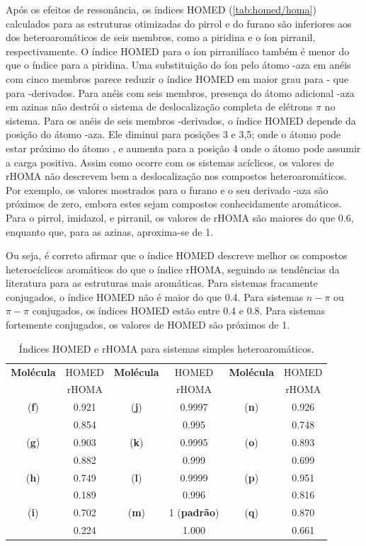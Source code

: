 Após os efeitos de ressonância, os índices \gls{HOMED} (\autoref{tab:homed/homa}) calculados para as estruturas otimizadas do pirrol e do furano são inferiores aos dos heteroaromáticos de seis membros, como a piridina e o íon pirranil, respectivamente. O índice \gls{HOMED} para o íon pirranilíaco também é menor do que o índice para a piridina. Uma substituição do íon  pelo átomo -aza em anéis com cinco membros parece reduzir o índice \gls{HOMED} em maior grau para - que para -derivados. Para anéis com seis membros, presença do átomo adicional -aza em azinas não destrói o sistema de deslocalização completa de elétrons $\pi$ no sistema. Para os anéis de seis membros -derivados, o índice \gls{HOMED} depende da posição do átomo -aza. Ele diminui para posições 3 e 3,5; onde o átomo  pode estar próximo do átomo , e aumenta para a posição 4 onde o átomo  pode assumir a carga positiva. Assim como ocorre com os sistemas acíclicos, os valores de \gls{rHOMA} não descrevem bem a deslocalização nos compostos heteroaromáticos. Por exemplo, os valores mostrados para o furano e o seu derivado -aza são próximos de zero, embora estes sejam compostos conhecidamente aromáticos. Para o pirrol, imidazol, e pirranil, os valores de \gls{rHOMA} são maiores do que 0.6, enquanto que, para as azinas, aproxima-se de 1. 

Ou seja, é correto afirmar que o índice \gls{HOMED} descreve melhor os compostos heterocíclicos aromáticos do que o índice \gls{rHOMA}, seguindo as tendências da literatura para as estruturas mais aromáticas. Para sistemas fracamente conjugados, o índice \gls{HOMED} não é maior do que 0.4. Para sistemas $n-\pi$ ou $\pi-\pi$ conjugados, os índices \gls{HOMED} estão entre 0.4 e 0.8. Para sistemas fortemente conjugados, os valores de \gls{HOMED} são próximos de 1.

\begin{table}[htb]
	\centering
	\caption{\label{tab:homed/homa} Índices \gls{HOMED} e \gls{rHOMA} para sistemas simples heteroaromáticos.}
	\begin{tabular}{cccccc}
		\toprule
	\textbf{Molécula} & \gls{HOMED} & \textbf{Molécula} & \gls{HOMED} & \textbf{Molécula} & \gls{HOMED}
 \\
  & \gls{rHOMA} & & \gls{rHOMA} & & \gls{rHOMA}
 \\
		\midrule
    (\textbf{f}) & 0.921 & (\textbf{j}) & 0.9997 & (\textbf{n}) & 0.926 \\
    & 0.854 & & 0.995 & & 0.748 \\
    (\textbf{g}) & 0.903 & (\textbf{k}) & 0.9995  & (\textbf{o}) & 0.893 \\
    & 0.882 & & 0.999 & &  0.699 \\
    (\textbf{h}) & 0.749  & (\textbf{l}) & 0.9999 & (\textbf{p}) & 0.951 \\
    & 0.189 & & 0.996 & & 0.816 \\
    (\textbf{i}) & 0.702 & (\textbf{m}) & 1 (\textbf{padrão}) & (\textbf{q}) & 0.870  \\
    & 0.224 & & 1.000 & & 0.661 \\
    \bottomrule
	\end{tabular}
\end{table}


